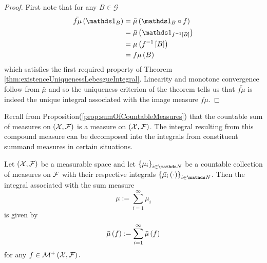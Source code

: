 \begin{proof}
First note that for any $B\in\mathcal{G}$
\begin{align*}
\lebInt{f\mu}{\indicate_{B}} & =\lebInt{\mu}{\indicate_{B}\circ f}\\
 & =\lebInt{\mu}{\indicate_{f^{-1}\left[B\right]}}\\
 & =\mu\left(f^{-1}\left[B\right]\right)\\
 & =f\mu\left(B\right)
\end{align*}
which satisfies the first required property of Theorem \ref{thm:existenceUniquenessLebesgueIntegral}.
Linearity and monotone convergence follow from $\bar{\mu}$ and so
the uniqueness criterion of the theorem tells us that $\bar{f\mu}$
is indeed the unique integral associated with the image measure $f\mu$.
\end{proof}
Recall from Proposition(\ref{prop:sumOfCountableMeasures}) that the
countable sum of measures on $\left(\mathcal{X},\mathcal{F}\right)$ is a measure on
$\left(\mathcal{X},\mathcal{F}\right)$. The integral resulting from this compound measure
can be decomposed into the integrals from constituent summand measures
in certain situations.
\begin{prop}
\label{prop:integralSumOfMeasures}Let $\left(\mathcal{X},\mathcal{F}\right)$ be a
measurable space and let $\left\{ \mu_{i}\right\} _{i\in\N}$ be a
countable collection of measures on $\mathcal{F}$ with their respective integrals
$\left\{ \lebInt{\mu_{i}}{\cdot}\right\} _{i\in\N}$. Then the integral
associated with the sum measure
\[
\mu:=\sum_{i=1}^{\infty}\mu_{i}
\]
is given by
\[
\bar{\mu}\left(f\right):=\sum_{i=1}^{\infty}\bar{\mu}\left(f\right)
\]
for any $f\in\mathcal{M}^{+}\left(\mathcal{X},\mathcal{F}\right).$
\end{prop}

